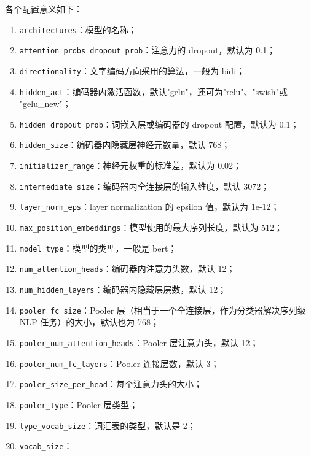 各个配置意义如下：
\begin{enumerate}
\item \verb`architectures`：模型的名称；
\item \verb`attention_probs_dropout_prob`：注意力的 dropout，默认为 0.1；
\item \verb`directionality`：文字编码方向采用的算法，一般为 bidi；
\item \verb`hidden_act`：编码器内激活函数，默认"gelu"，还可为"relu"、"swish"或 "gelu_new"；
\item \verb`hidden_dropout_prob`：词嵌入层或编码器的 dropout 配置，默认为 0.1；
\item \verb`hidden_size`：编码器内隐藏层神经元数量，默认 768；
\item \verb`initializer_range`：神经元权重的标准差，默认为 0.02；
\item \verb`intermediate_size`：编码器内全连接层的输入维度，默认 3072；
\item \verb`layer_norm_eps`：layer normalization 的 epsilon 值，默认为 1e-12；
\item \verb`max_position_embeddings`：模型使用的最大序列长度，默认为 512；
\item \verb`model_type`：模型的类型，一般是 bert；
\item \verb`num_attention_heads`：编码器内注意力头数，默认 12；
\item \verb`num_hidden_layers`：编码器内隐藏层层数，默认 12；
\item \verb`pooler_fc_size`：Pooler 层（相当于一个全连接层，作为分类器解决序列级 NLP 任务）的大小，默认也为 768；
\item \verb`pooler_num_attention_heads`：Pooler 层注意力头，默认 12；
\item \verb`pooler_num_fc_layers`：Pooler 连接层数，默认 3；
\item \verb`pooler_size_per_head`：每个注意力头的大小；
\item \verb`pooler_type`：Pooler 层类型；
\item \verb`type_vocab_size`：词汇表的类型，默认是 2；
\item \verb`vocab_size`：
\end{enumerate}